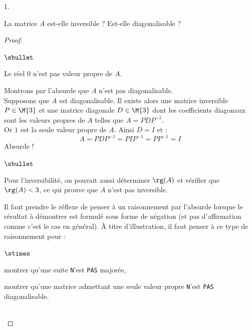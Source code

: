 \documentclass[11pt]{article}%
\begin{document}
\begin{noliste}{1.}
\item La matrice $A$ est-elle inversible ? Est-elle diagonalisable ?

  \begin{proof}~
    \begin{noliste}{$\sbullet$}
    \item Le réel $0$ n'est pas valeur propre de $A$.
    \item Montrons par l'absurde que $A$ n'est pas diagonalisable.\\
      Supposons que $A$ est diagonalisable. Il existe alors une
      matrice inversible $P \in \M{3}$ et une matrice diagonale $D \in
      \M{3}$ dont les coefficients diagonaux sont les valeurs propres
      de $A$ telles que $A=PDP^{-1}$.\\
      Or $1$ est la seule valeur propre de $A$. Ainsi $D = I$ et :
      \[
      A = PDP^{-1} = PIP^{-1} = PP^{-1} = I
      \]
      Absurde !%
    \end{noliste}
    \begin{remark}
      \begin{noliste}{$\sbullet$}
      \item Pour l'inversibilité, on pouvait aussi déterminer $\rg(A)$ et
        vérifier que $\rg(A)<3$, ce qui prouve que $A$ n'est pas
        inversible.
        
      \item Il faut prendre le réflexe de penser à un raisonnement par
        l'absurde lorsque le résultat à démontrer est formulé sous forme
        de négation (et pas d'affirmation comme c'est le cas en
        général). À titre d'illustration, il faut penser à ce type de
        raisonnement pour :
        \begin{noliste}{$\stimes$}
        \item montrer qu'une suite {\tt N}'est {\tt PAS} majorée,
        \item montrer qu'une matrice admettant une seule valeur propre
          {\tt N}'est {\tt PAS} diagonalisable.
        \end{noliste}
      \end{noliste}
    \end{remark}~\\[-1.4cm]
  \end{proof}
\end{noliste}
\end{document}
